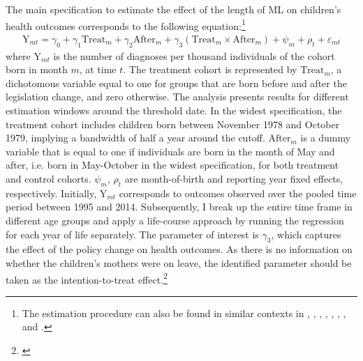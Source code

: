 The main specification to estimate the effect of the length of ML on children's health outcomes corresponds to the following equation:\footnote{The estimation procedure can also be found in similar contexts in \cite{RafaelLaliveandJosefZweimuller2009}, \cite{Dustmann2012}, \cite{Ekberg2013parental}, \cite{schonberg2014expansions}, \cite{Lalive2014}, \cite{danzer2017}, \cite{avdic2018modern}, and \cite{Huebener2017}.} %
\begin{align}
\text{Y}_{mt} = \gamma_0 + \gamma_1 \text{Treat}_{m} + \gamma_2 \text{After}_{m} + \gamma_3 (\text{Treat}_{m} \times \text{After}_{m}) + \psi_m + \rho_t + \varepsilon_{mt} \label{eq_mlch:DD_basline}
\end{align}
where $\text{Y}_{mt}$ is the number of diagnoses per thousand individuals of the cohort born in month $m$, at time $t$. The treatment cohort is represented by $\text{Treat}_{m}$, a dichotomous variable equal to one for groups that are born  before and after the legislation change, and zero otherwise. The analysis presents results for different estimation windows around the threshold date. In the widest specification, the treatment cohort includes children born between November 1978 and October 1979, implying a bandwidth of half a year around the cutoff. $\text{After}_{m}$ is a dummy variable that is equal to one if individuals are born in the month of May and after, i.e. born in May-October in the widest specification, for both treatment and control cohorts. $\psi_m$, $\rho_t$ are month-of-birth and reporting year fixed effects, respectively. Initially, $\text{Y}_{mt}$ corresponds to outcomes observed over the pooled time period between 1995 and 2014. Subsequently, I break up the entire time frame in different age groups and apply a life-course approach by running the regression for each year of life separately. The parameter of interest is $\gamma_3$, which captures the effect of the policy change on health outcomes. As there is no information on whether the children's mothers were on leave, the identified parameter should be taken as the intention-to-treat effect.\footnote{\label{rev_mlch: r2_itt_late}} 

